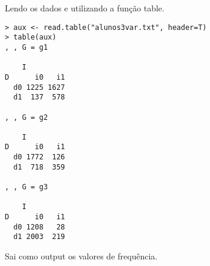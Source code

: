 \item

Lendo os dados e utilizando a função table.

\begin{lstlisting}
> aux <- read.table("alunos3var.txt", header=T)
> table(aux)
, , G = g1

    I
D      i0   i1
  d0 1225 1627
  d1  137  578

, , G = g2

    I
D      i0   i1
  d0 1772  126
  d1  718  359

, , G = g3

    I
D      i0   i1
  d0 1208   28
  d1 2003  219
\end{lstlisting}

Sai como output os valores de frequência.
